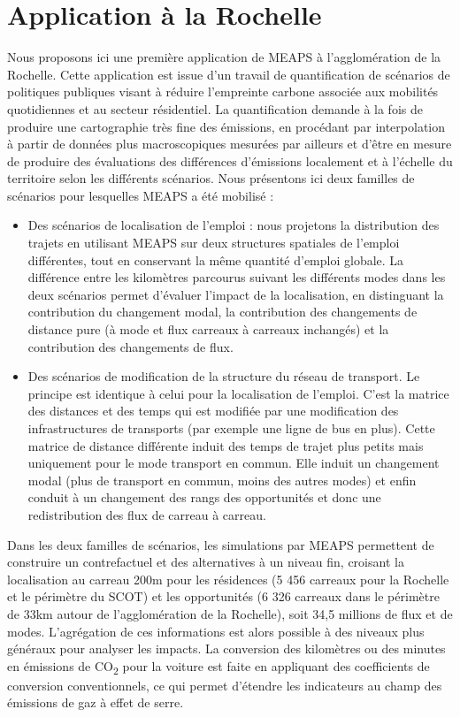 \documentclass[
  10pt,
  a4paper,
  numbers=noendperiod,
  DIV=9]{scrreprt}
\begin{document}

\hypertarget{application-uxe0-la-rochelle}{%
\chapter{Application à la Rochelle}\label{application-uxe0-la-rochelle}}

Nous proposons ici une première application de MEAPS à l'agglomération
de la Rochelle. Cette application est issue d'un travail de
quantification de scénarios de politiques publiques visant à réduire
l'empreinte carbone associée aux mobilités quotidiennes et au secteur
résidentiel. La quantification demande à la fois de produire une
cartographie très fine des émissions, en procédant par interpolation à
partir de données plus macroscopiques mesurées par ailleurs et d'être en
mesure de produire des évaluations des différences d'émissions
localement et à l'échelle du territoire selon les différents scénarios.
Nous présentons ici deux familles de scénarios pour lesquelles MEAPS a
été mobilisé :

\begin{itemize}
\item
  Des scénarios de localisation de l'emploi : nous projetons la
  distribution des trajets en utilisant MEAPS sur deux structures
  spatiales de l'emploi différentes, tout en conservant la même quantité
  d'emploi globale. La différence entre les kilomètres parcourus suivant
  les différents modes dans les deux scénarios permet d'évaluer l'impact
  de la localisation, en distinguant la contribution du changement
  modal, la contribution des changements de distance pure (à mode et
  flux carreaux à carreaux inchangés) et la contribution des changements
  de flux.
\item
  Des scénarios de modification de la structure du réseau de transport.
  Le principe est identique à celui pour la localisation de l'emploi.
  C'est la matrice des distances et des temps qui est modifiée par une
  modification des infrastructures de transports (par exemple une ligne
  de bus en plus). Cette matrice de distance différente induit des temps
  de trajet plus petits mais uniquement pour le mode transport en
  commun. Elle induit un changement modal (plus de transport en commun,
  moins des autres modes) et enfin conduit à un changement des rangs des
  opportunités et donc une redistribution des flux de carreau à carreau.
\end{itemize}

Dans les deux familles de scénarios, les simulations par MEAPS
permettent de construire un contrefactuel et des alternatives à un
niveau fin, croisant la localisation au carreau 200m pour les résidences
(5 456 carreaux pour la Rochelle et le périmètre du SCOT) et les
opportunités (6 326 carreaux dans le périmètre de 33km autour de
l'agglomération de la Rochelle), soit 34,5 millions de flux et de modes.
L'agrégation de ces informations est alors possible à des niveaux plus
généraux pour analyser les impacts. La conversion des kilomètres ou des
minutes en émissions de CO\textsubscript{2} pour la voiture est faite en
appliquant des coefficients de conversion conventionnels, ce qui permet
d'étendre les indicateurs au champ des émissions de gaz à effet de
serre.
\end{document}
